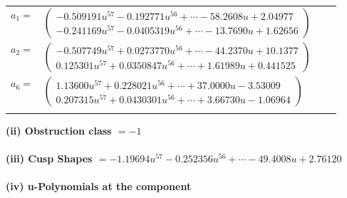 \documentclass[1p]{elsarticle_modified}
\theoremstyle{definition}
\begin{document}
\begin{tabular}{m{7pt} m{180pt} m{7pt} m{180pt} }
\flushright $a_{1}=$&$\begin{pmatrix}-0.509191 u^{57}-0.192771 u^{56}+\cdots-58.2608 u+2.04977\\-0.241169 u^{57}-0.0405319 u^{56}+\cdots-13.7690 u+1.62656\end{pmatrix}$ \\
\flushright $a_{2}=$&$\begin{pmatrix}-0.507749 u^{57}+0.0273770 u^{56}+\cdots-44.2370 u+10.1377\\0.125301 u^{57}+0.0350847 u^{56}+\cdots+1.61989 u+0.441525\end{pmatrix}$ \\
\flushright $a_{6}=$&$\begin{pmatrix}1.13600 u^{57}+0.228021 u^{56}+\cdots+37.0000 u-3.53009\\0.207315 u^{57}+0.0430301 u^{56}+\cdots+3.66730 u-1.06964\end{pmatrix}$\\&\end{tabular}
\flushleft \textbf{(ii) Obstruction class $= -1$}\\~\\
\flushleft \textbf{(iii) Cusp Shapes $= -1.19694 u^{57}-0.252356 u^{56}+\cdots-49.4008 u+2.76120$}\\~\\
\newpage\renewcommand{\arraystretch}{1}
\flushleft \textbf{(iv) u-Polynomials at the component}\newline \\
\end{document}
